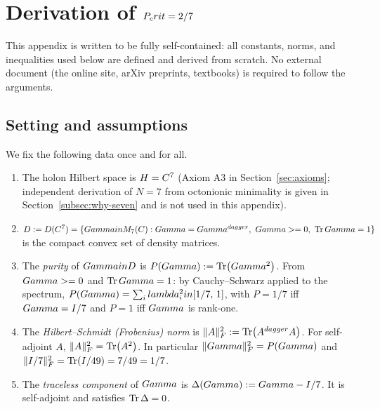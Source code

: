 
\section{Derivation of $P_crit = 2/7$}
\label{app:pcrit}

This appendix is written to be fully self-contained: all constants, norms, and
inequalities used below are defined and derived from scratch. No external
document (the online site, arXiv preprints, textbooks) is required to follow
the arguments.

\subsection{Setting and assumptions}
\label{app:pcrit-setting}

We fix the following data once and for all.

\begin{enumerate}[leftmargin=2em,nosep]
  \item The holon Hilbert space is $H = C^7$ (Axiom A3 in
    Section~\ref{sec:axioms}; independent derivation of $N=7$ from octonionic
    minimality is given in Section~\ref{subsec:why-seven} and is not used
    in this appendix).
  \item $D := D(C^7) = \{Gamma in M_7(C) : Gamma = Gamma^{dagger},\ Gamma >= 0,\ \Tr Gamma = 1\}$
    is the compact convex set of density matrices.
  \item The \emph{purity} of $Gamma in D$ is $P(Gamma) := \Tr(Gamma^2)$.
    From $Gamma >= 0$ and $\Tr Gamma = 1$: by Cauchy--Schwarz applied to the
    spectrum,
    $P(Gamma) = \sum_i lambda_i^2 in [1/7,\,1]$,
    with $P = 1/7$ iff $Gamma = I/7$ and $P = 1$ iff $Gamma$ is rank-one.
  \item The \emph{Hilbert--Schmidt (Frobenius) norm} is
    $\|A\|_F^2 := \Tr(A^{dagger}A)$. For self-adjoint $A$,
    $\|A\|_F^2 = \Tr(A^2)$. In particular $\|Gamma\|_F^2 = P(Gamma)$ and
    $\|I/7\|_F^2 = \Tr(I/49) = 7/49 = 1/7$.
  \item The \emph{traceless component} of $Gamma$ is $\Delta(Gamma) := Gamma - I/7$.
    It is self-adjoint and satisfies $\Tr\Delta = 0$.
\end{enumerate}

